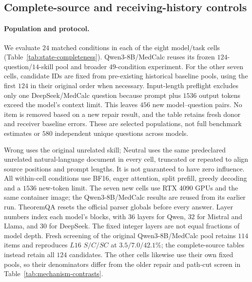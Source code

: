 \subsection{Complete-source and receiving-history controls}
\label{app:state-completeness}

\paragraph{Population and protocol.}
We evaluate $24$ matched conditions in each of the eight model/task cells
(Table~\ref{tab:state-completeness}). Qwen3-8B/MedCalc reuses its frozen
$124$-question/$14$-skill pool and broader $49$-condition experiment.
For the other seven cells, candidate IDs are fixed from pre-existing
historical baseline pools, using the first $124$ in their original order
when necessary. Input-length preflight excludes only one DeepSeek/MedCalc
question because prompt plus $1536$ output tokens exceed the model's
context limit. This leaves $456$ new model--question pairs. No item is
removed based on a new repair result, and the table retains fresh donor
and receiver baseline errors. These are selected populations, not full
benchmark estimates or $580$ independent unique questions across models.

Wrong uses the original unrelated skill; Neutral uses the same predeclared
unrelated natural-language document in every cell, truncated or repeated
to align source positions and prompt lengths. It is not guaranteed to
have zero influence. All within-cell conditions use BF16, eager attention,
split prefill, greedy decoding and a $1536$ new-token limit. The seven new
cells use RTX 4090 GPUs and the same container image; the Qwen3-8B/MedCalc
results are reused from its earlier run. TheoremQA resets the official
parser globals before every answer. Layer numbers index each model's
blocks, with $36$ layers for Qwen, $32$ for Mistral and Llama, and $30$ for DeepSeek. The fixed integer layers are not equal fractions of
model depth.
Fresh screening of the original Qwen3-8B/MedCalc pool retains $114$ items
and reproduces $L16$ $S/C/SC$ at $3.5/7.0/42.1\%$; the complete-source
tables instead retain all $124$ candidates. The other cells likewise use
their own fixed pools, so their denominators differ from the older repair
and path-cut screen in Table~\ref{tab:mechanism-contrasts}.


